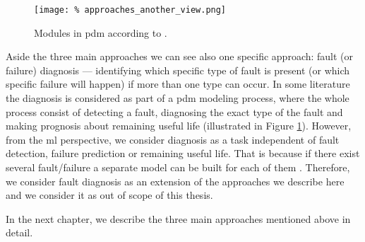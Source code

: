 \begin{figure}
    \centering
    \texttt{[image: \%
        approaches\_another\_view.png]}
    \caption{Modules in \gls{pdm} according to \cite{wesley2008current}.}
    \label{fig:approaches_another_view}
\end{figure}

Aside the three main approaches we can see also one specific approach: fault (or failure) diagnosis --- identifying which specific type of fault is present (or which specific failure will happen) if more than one type can occur.
In some literature the diagnosis is considered as part of a \gls{pdm} modeling process, where the whole process consist of detecting a fault, diagnosing the exact type of the fault and making prognosis about remaining useful life \cite{wesley2008current} (illustrated in Figure \ref{fig:approaches_another_view}).
However, from the \gls{ml} perspective, we consider diagnosis as a task independent of fault detection, failure prediction or remaining useful life.
That is because if there exist several fault/failure a separate model can be built for each of them \cite{widodo2007support}.
Therefore, we consider fault diagnosis as an extension of the approaches we describe here and we consider it as out of scope of this thesis.

In the next chapter, we describe the three main approaches mentioned above in detail.
